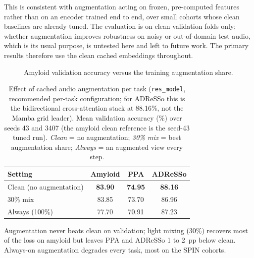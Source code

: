 This is consistent with augmentation acting on frozen, pre-computed features rather than on an encoder trained end to end, over small cohorts whose clean baselines are already tuned. The evaluation is on clean validation folds only; whether augmentation improves robustness on noisy or out-of-domain test audio, which is its usual purpose, is untested here and left to future work. The primary results therefore use the clean cached embeddings throughout.

\begin{figure}[htbp]
\centering
{}
\caption[Amyloid accuracy versus augmentation share]{Amyloid validation accuracy versus the training augmentation share.}
\label{fig:res_aug}
\end{figure}

\begin{table}[htbp]
\centering
\caption[Audio-augmentation effect per task]{Effect of cached audio augmentation per task (\texttt{res\_model}, recommended per-task configuration; for ADReSSo this is the bidirectional cross-attention stack at 88.16\%, not the Mamba grid leader). Mean validation accuracy (\%) over seeds 43 and 3407 (the amyloid clean reference is the seed-43 tuned run). \emph{Clean} = no augmentation; \emph{30\% mix} = best augmentation share; \emph{Always} = an augmented view every step.}
\label{tab:res_aug}
\small
\begin{tabular}{lccc}
\toprule
Setting & \textbf{Amyloid} & \textbf{PPA} & \textbf{ADReSSo} \\
\midrule
Clean (no augmentation) & \textbf{83.90} & \textbf{74.95} & \textbf{88.16} \\
30\% mix                & 83.85 & 73.70 & 86.96 \\
Always (100\%)          & 77.70 & 70.91 & 87.23 \\
\bottomrule
\end{tabular}

\vspace{2pt}
{\footnotesize Augmentation never beats clean on validation; light mixing (30\%) recovers most of the loss on amyloid but leaves PPA and ADReSSo 1 to 2~pp below clean. Always-on augmentation degrades every task, most on the SPIN cohorts.}
\end{table}

